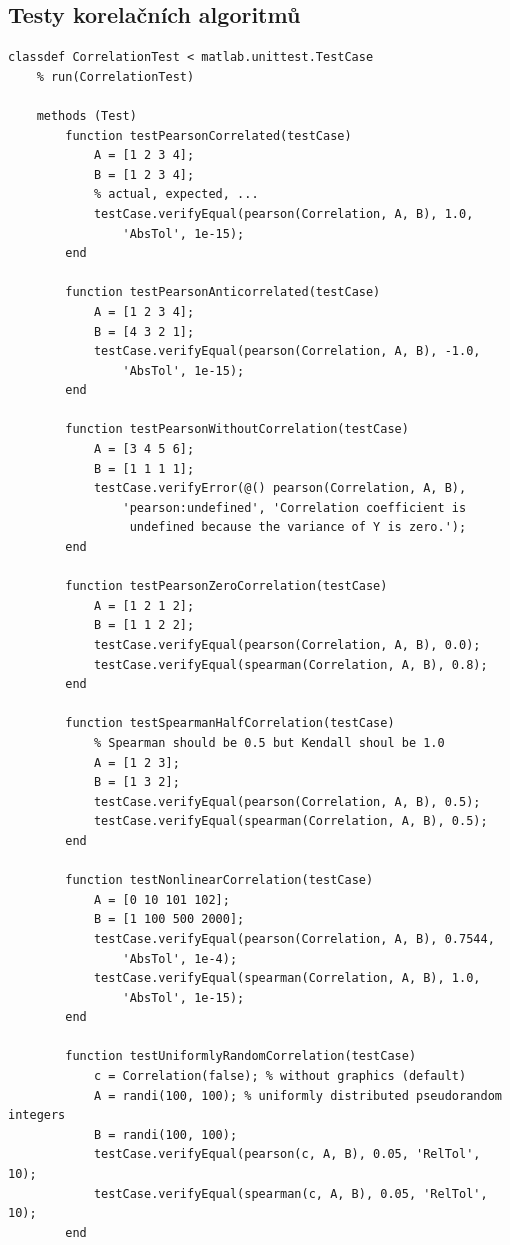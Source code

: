 \subsection*{Testy korelačních algoritmů}
\begin{verbatim}
classdef CorrelationTest < matlab.unittest.TestCase
    % run(CorrelationTest)

    methods (Test)
        function testPearsonCorrelated(testCase)
            A = [1 2 3 4];
            B = [1 2 3 4];
            % actual, expected, ...
            testCase.verifyEqual(pearson(Correlation, A, B), 1.0,
                'AbsTol', 1e-15);
        end

        function testPearsonAnticorrelated(testCase)
            A = [1 2 3 4];
            B = [4 3 2 1];
            testCase.verifyEqual(pearson(Correlation, A, B), -1.0,
                'AbsTol', 1e-15);
        end

        function testPearsonWithoutCorrelation(testCase)
            A = [3 4 5 6];
            B = [1 1 1 1];
            testCase.verifyError(@() pearson(Correlation, A, B),
                'pearson:undefined', 'Correlation coefficient is
                 undefined because the variance of Y is zero.');
        end

        function testPearsonZeroCorrelation(testCase)
            A = [1 2 1 2];
            B = [1 1 2 2];
            testCase.verifyEqual(pearson(Correlation, A, B), 0.0);
            testCase.verifyEqual(spearman(Correlation, A, B), 0.8);
        end

        function testSpearmanHalfCorrelation(testCase)
            % Spearman should be 0.5 but Kendall shoul be 1.0
            A = [1 2 3];
            B = [1 3 2];
            testCase.verifyEqual(pearson(Correlation, A, B), 0.5);
            testCase.verifyEqual(spearman(Correlation, A, B), 0.5);
        end

        function testNonlinearCorrelation(testCase)
            A = [0 10 101 102];
            B = [1 100 500 2000];
            testCase.verifyEqual(pearson(Correlation, A, B), 0.7544,
                'AbsTol', 1e-4);
            testCase.verifyEqual(spearman(Correlation, A, B), 1.0,
                'AbsTol', 1e-15);
        end

        function testUniformlyRandomCorrelation(testCase)
            c = Correlation(false); % without graphics (default)
            A = randi(100, 100); % uniformly distributed pseudorandom integers
            B = randi(100, 100);
            testCase.verifyEqual(pearson(c, A, B), 0.05, 'RelTol', 10);
            testCase.verifyEqual(spearman(c, A, B), 0.05, 'RelTol', 10);
        end


\end{verbatim}
